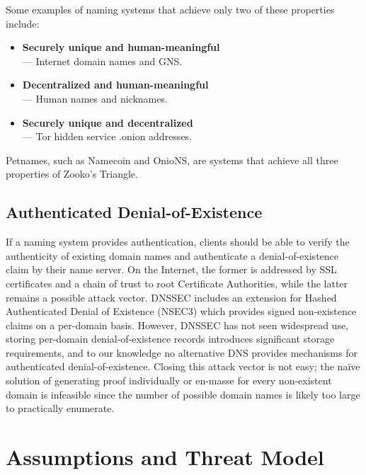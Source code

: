 \documentclass{sig-alternate}
\begin{document}
Some examples of naming systems that achieve only two of these properties include:

\begin{itemize}[noitemsep]
	\item \textbf{Securely unique and human-meaningful} \\ --- Internet domain names and GNS.
	\item \textbf{Decentralized and human-meaningful} \\ --- Human names and nicknames.
	\item \textbf{Securely unique and decentralized} \\ --- Tor hidden service .onion addresses.
\end{itemize}

Petnames, such as Namecoin and OnioNS, are systems that achieve all three properties of Zooko's Triangle.

\subsection{Authenticated Denial-of-Existence} %

If a naming system provides authentication, clients should be able to verify the authenticity of existing domain names and authenticate a denial-of-existence claim by their name server. On the Internet, the former is addressed by SSL certificates and a chain of trust to root Certificate Authorities, while the latter remains a possible attack vector. DNSSEC includes an extension for Hashed Authenticated Denial of Existence (NSEC3) which provides signed non-existence claims on a per-domain basis. However, DNSSEC has not seen widespread use, storing per-domain denial-of-existence records introduces significant storage requirements, and to our knowledge no alternative DNS provides mechanisms for authenticated denial-of-existence. Closing this attack vector is not easy; the na\"{i}ve solution of generating proof individually or en-masse for every non-existent domain is infeasible since the number of possible domain names is likely too large to practically enumerate.

\newpage

\section{Assumptions and Threat Model} %
\end{document}

